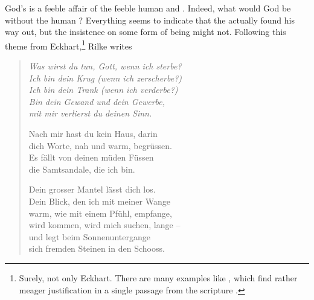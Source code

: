 {\pa God's  is a feeble affair of the feeble human
 and .   Indeed, what would
God be without the human ?  
Everything seems to indicate that the  actually found his way out, but the  insistence
on some form of  being might not.  Following this
theme from Eckhart,\footnote{Surely, not only Eckhart.  There are many 
examples like , which find rather meager justification in a single 
passage from the scripture .} Rilke writes
{\begin{verse}{\small{\em Was wirst du tun, Gott, wenn ich sterbe?  \\
Ich bin dein Krug (wenn ich zerscherbe?) \\
Ich bin dein Trank (wenn ich verderbe?) \\
Bin dein Gewand und dein Gewerbe,\\
mit mir verlierst du deinen Sinn.

Nach mir hast du kein Haus, darin\\
dich Worte, nah und warm, begr\"{u}ssen.\\
Es f\"{a}llt von deinen m\"{u}den F\"{u}ssen\\
die Samtsandale, die ich bin.

Dein grosser Mantel l\"{a}sst dich los.\\
Dein Blick, den ich mit meiner Wange\\
warm, wie mit einem Pf\"{u}hl, empfange,\\
wird kommen, wird mich suchen, lange --\\
und legt beim Sonnenuntergange\\
sich fremden Steinen in den Schooss.

}}
\end{verse}}}
